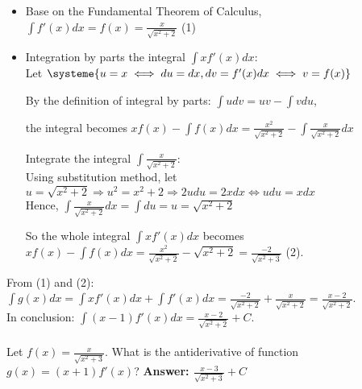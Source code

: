 \documentclass{article}
\begin{document}
    \begin{itemize}
        \item Base on the Fundamental Theorem of Calculus,\\

        $\displaystyle \int f'(x) dx = f(x) = \frac{x}{\sqrt{x^2 + 2}}$ (1)

        \item
        Integration by parts the integral $\displaystyle \int xf'(x) dx$:\\

        Let $\systeme{u = x \iff du = dx, dv = f'(x) dx \iff v = f(x)}$

        By the definition of integral by parts:
        $\displaystyle \int u dv = uv - \int v du$,

        the integral becomes $\displaystyle xf(x) - \int f(x) dx = \frac{x^2}{\sqrt{x^2 + 2}} - \int \frac{x}{\sqrt{x^2 + 2}} dx$

        \subitem
        Integrate the integral $\displaystyle\int \frac{x}{\sqrt{x^2 + 2}}$:\\

        Using substitution method, let $\displaystyle u = \sqrt{x^2 + 2} \Rightarrow u^2 = x^2 + 2 \Rightarrow 2udu = 2xdx \iff udu = xdx$\\

        Hence, $\displaystyle \int \frac{x}{\sqrt{x^2 + 2}} dx = \int du = u = \sqrt{x^2 + 2}$

        So the whole integral $\displaystyle \int xf'(x) dx$ becomes $\displaystyle xf(x) - \int f(x) dx = \frac{x^2}{\sqrt{x^2 + 2}} - \sqrt{x^2 + 2} = \frac{-2}{\sqrt{x^2 + 3}}$ (2).\\
    \end{itemize}

    From (1) and (2):\\

    $\displaystyle \int g(x) dx = \int xf'(x) dx + \int f'(x) dx = \frac{-2}{\sqrt{x^2 + 2}} + \frac{x}{\sqrt{x^2 + 2}} = \frac{x - 2}{\sqrt{x^2 + 2}}$.\\

    In conclusion: $\displaystyle \int (x - 1)f'(x) dx = \frac{x - 2}{\sqrt{x^2 + 2}} + C$.

    \paragraph{\cite{42@116}} Let $\displaystyle f(x) = \frac{x}{\sqrt{x^2 + 3}}$. What is the antiderivative of function $\displaystyle g(x) = (x + 1)f'(x)$? \textbf{Answer: $\displaystyle \frac{x - 3}{\sqrt{x^2 + 3}} + C$}\\
\end{document}
